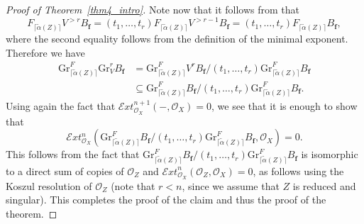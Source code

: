 \documentclass[JEP,XML,SOM,Unicode]{cedram}
\theoremstyle{plain}
\theoremstyle{definition}
\newcommand\cE{\mathcal{E}}
\newcommand\cO{\mathcal{O}}
\newcommand\cO{\mathcal{O}}
\newcommand\bff{{\boldsymbol f}}
\newcommand\gr{\mathrm{Gr}}
\begin{document}
\begin{proof}[Proof of Theorem~\ref{thm4_intro}]
Note now that it follows from \cite[Th.\,1.1]{CD} that\vspace*{-3pt}
\[F_{\lceil \widetilde{\alpha}(Z) \rceil} V^{>r}B_\bff = (t_1,\ldots,t_r)F_{\lceil \widetilde{\alpha}(Z)\rceil}V^{>r-1}B_{\bff}=
(t_1,\dots, t_r)F_{\lceil \widetilde{\alpha}(Z) \rceil} B_\bff,\]
where the second equality follows from the definition of the minimal exponent.
Therefore we have\vspace*{-3pt}
\[\begin{aligned} \gr^F_{\lceil \widetilde{\alpha}(Z) \rceil} \gr^r_V B_\bff&=\gr^F_{\lceil \widetilde{\alpha}(Z) \rceil}V^rB_{\bff}/(t_1,\ldots,t_r)\gr^F_{\lceil \widetilde{\alpha}(Z) \rceil}B_{\bff} \\
&\subseteq \gr^F_{\lceil \widetilde{\alpha}(Z) \rceil}B_\bff/(t_1,\dots, t_r) \gr^F_{\lceil \widetilde{\alpha}(Z) \rceil}B_\bff. \end{aligned}\]
Using again the fact that ${\mathcal Ext}^{n+1}_{\cO_X}(-,\cO_X)=0$, we see that it is enough to show that\vspace*{-3pt}
\[ \cE xt^n_{\cO_X}(\gr^F_{\lceil \widetilde{\alpha}(Z) \rceil}B_\bff/(t_1,\dots, t_r) \gr^F_{\lceil \widetilde{\alpha}(Z) \rceil}B_\bff,\cO_X) =0.\]
This follows from the fact that $\gr^F_{\lceil \widetilde{\alpha}(Z) \rceil}B_\bff/(t_1,\dots, t_r) \gr^F_{\lceil \widetilde{\alpha}(Z) \rceil}B_\bff$
is isomorphic to a direct sum of copies of $\cO_Z$ and ${\mathcal Ext}^n_{\cO_X}(\cO_Z,\cO_X)=0$, as follows using the
Koszul resolution of $\cO_Z$ (note that $r<n$, since we assume that $Z$ is reduced and singular). This completes the proof of the claim and thus
the proof of the theorem.
\end{proof}

\backmatter


\end{document}
